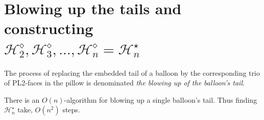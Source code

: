 


\section{Blowing up the tails and
constructing\\ $\mathcal{H}_{2}^\diamond, \mathcal{H}_{3}^\diamond, 
\ldots, \mathcal{H}_{n}^\diamond=\mathcal{H}_{n}^\star$}

The process of replacing the embedded tail of a balloon by the corresponding
trio of PL2-faces in the pillow is denominated  {\em the blowing up of the 
balloon's tail}.

\begin{theorem}\label{theo:teoremadeumalinha}
 There is an $O(n)$-algorithm for blowing up a single balloon's tail.
Thus finding $\mathcal{H}_n^\star$ take, $O(n^2)$ steps.
\end{theorem}
